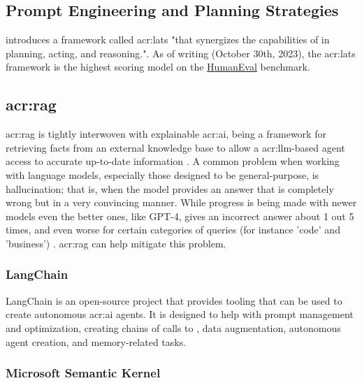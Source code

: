 \subsection{Prompt Engineering and Planning Strategies}\label{subsec:prompt-engineering-and-planning-strategies}

\cite{zhouLanguageAgentTree2023} introduces a framework called \gls{acr:lats} "that synergizes the capabilities of  in planning, acting, and reasoning.". As of writing (October 30th, 2023), the \gls{acr:lats} framework is the highest scoring model on the \hyperref[subsubsec:humaneval]{HumanEval} benchmark.

\subsection[Retrieval Augmented Generation]{\acrlong{acr:rag}}\label{subsec:retrieval-automented-generation}

\gls{acr:rag} is tightly interwoven with explainable \acrshort{acr:ai}, being a framework for retrieving facts from an external knowledge base to allow a \acrshort{acr:llm}-based agent access to accurate up-to-date information \citep{martineauWhatRetrievalaugmentedGeneration2023}. A common problem when working with language models, especially those designed to be general-purpose, is hallucination; that is, when the model provides an answer that is completely wrong but in a very convincing manner. While progress is being made with newer models even the better ones, like GPT-4, gives an incorrect answer about 1 out 5 times, and even worse for certain categories of queries (for instance 'code' and 'business') \citep[10]{openaiGPT4TechnicalReport2023}. \acrlong{acr:rag} can help mitigate this problem.

\subsubsection{LangChain}\label{subsubsec:langchain}

LangChain \citep{chaseLangChain2022} is an open-source project that provides tooling that can be used to create autonomous \acrshort{acr:ai} agents. It is designed to help with prompt management and optimization, creating chains of calls to , data augmentation, autonomous agent creation, and memory-related tasks.

\subsubsection{Microsoft Semantic Kernel}\label{subsubsec:microsoft-semantic-kernel}

